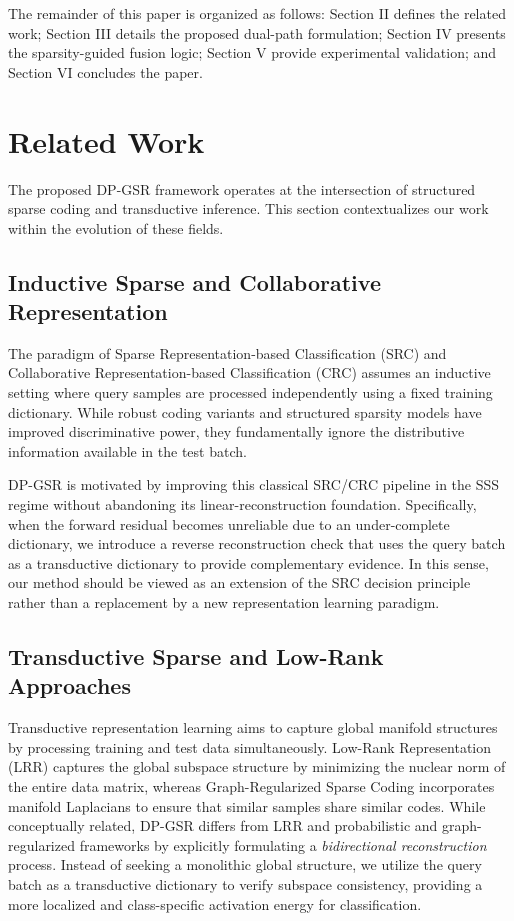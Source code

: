 \documentclass[10pt,comsoc]{IEEEtran}
\begin{document}
The remainder of this paper is organized as follows: Section II defines the related work; Section III details the proposed dual-path formulation; Section IV presents the sparsity-guided fusion logic; Section V provide experimental validation; and Section VI concludes the paper.

\section{Related Work}

The proposed DP-GSR framework operates at the intersection of structured sparse coding and transductive inference. This section contextualizes our work within the evolution of these fields.

\subsection{Inductive Sparse and Collaborative Representation}
The paradigm of Sparse Representation-based Classification (SRC) \cite{wright2009robust} and Collaborative Representation-based Classification (CRC) \cite{zhang2011sparse} assumes an inductive setting where query samples are processed independently using a fixed training dictionary. While robust coding variants \cite{yang2017robust} and structured sparsity models \cite{elhamifar2013robust} have improved discriminative power, they fundamentally ignore the distributive information available in the test batch.

DP-GSR is motivated by improving this classical SRC/CRC pipeline in the SSS regime without abandoning its linear-reconstruction foundation. Specifically, when the forward residual becomes unreliable due to an under-complete dictionary, we introduce a reverse reconstruction check that uses the query batch as a transductive dictionary to provide complementary evidence. In this sense, our method should be viewed as an extension of the SRC decision principle rather than a replacement by a new representation learning paradigm.

\subsection{Transductive Sparse and Low-Rank Approaches}
Transductive representation learning aims to capture global manifold structures by processing training and test data simultaneously. Low-Rank Representation (LRR) \cite{liu2013low} captures the global subspace structure by minimizing the nuclear norm of the entire data matrix, whereas Graph-Regularized Sparse Coding \cite{zheng2011graph} incorporates manifold Laplacians to ensure that similar samples share similar codes. While conceptually related, DP-GSR differs from LRR and probabilistic and graph-regularized frameworks \cite{cai2016probabilistic, zheng2011graph} by explicitly formulating a \textit{bidirectional reconstruction} process. Instead of seeking a monolithic global structure, we utilize the query batch as a transductive dictionary to verify subspace consistency, providing a more localized and class-specific activation energy for classification.
\end{document}
